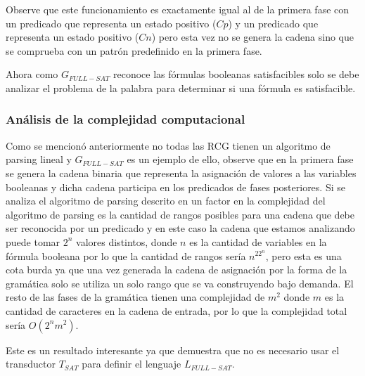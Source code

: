 \begin{itemize}
          Observe que este funcionamiento es exactamente igual al de la primera fase con un predicado que representa un estado
          positivo ($Cp$) y un predicado que representa un estado
          positivo ($Cn$) pero esta vez no se genera la cadena sino que se comprueba con un patrón predefinido en la primera
          fase.
          
          Ahora como $G_{FULL-SAT}$ reconoce las fórmulas booleanas satisfacibles solo se debe analizar el problema de la
          palabra para determinar si una fórmula es satisfacible.
          
          \subsubsection{Análisis de la complejidad computacional}
          
          Como se mencionó anteriormente no todas las RCG tienen un algoritmo de parsing lineal y $G_{FULL-SAT}$ es un ejemplo de 
          ello, observe que en la primera fase se genera la cadena binaria que representa la asignación de valores a las variables
          booleanas y dicha cadena participa en los predicados de fases posteriores. Si se analiza el algoritmo de parsing descrito en 
          \cite{mainRCGBib} un factor en la complejidad del algoritmo de parsing es la cantidad de rangos posibles para una cadena 
          que debe ser reconocida por un predicado y en este caso la cadena que estamos analizando puede tomar $2^n$ valores distintos, donde
          $n$ es la cantidad de variables en la fórmula booleana por lo que la cantidad de rangos sería $n^22^n$, pero esta es una cota
          burda ya que una vez generada la cadena de asignación por la forma de la gramática solo se utiliza un solo rango que se va construyendo
          bajo demanda. El resto de las fases de la gramática tienen una complejidad de $m^2$ donde $m$ es la cantidad de caracteres
          en la cadena de entrada, por lo que la complejidad total sería $O(2^nm^2)$.
          
          Este es un resultado interesante ya que demuestra que no es necesario usar el transductor $T_{SAT}$ para definir el 
          lenguaje $L_{FULL-SAT}$.
          
          
\end{itemize}
